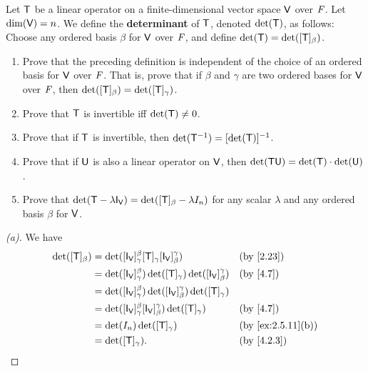 \begin{ex}\label{ex:5.1.7}
  Let \(\mathsf{T}\) be a linear operator on a finite-dimensional vector space \(\mathsf{V}\) over \(\mathit{F}\).
  Let \(\dim(\mathsf{V}) = n\).
  We define the \textbf{determinant} of \(\mathsf{T}\), denoted \(\det(\mathsf{T})\), as follows:
  Choose any ordered basis \(\beta\) for \(\mathsf{V}\) over \(\mathit{F}\), and define \(\det(\mathsf{T}) = \det([\mathsf{T}]_{\beta})\).
  \begin{enumerate}
    \item Prove that the preceding definition is independent of the choice of an ordered basis for \(\mathsf{V}\) over \(\mathit{F}\).
          That is, prove that if \(\beta\) and \(\gamma\) are two ordered bases for \(\mathsf{V}\) over \(\mathit{F}\), then \(\det([\mathsf{T}]_{\beta}) = \det([\mathsf{T}]_{\gamma})\).
    \item Prove that \(\mathsf{T}\) is invertible iff \(\det(\mathsf{T}) \neq 0\).
    \item Prove that if \(\mathsf{T}\) is invertible, then \(\det(\mathsf{T}^{-1}) = [\det(\mathsf{T})]^{-1}\).
    \item Prove that if \(\mathsf{U}\) is also a linear operator on \(\mathsf{V}\), then \(\det(\mathsf{T} \mathsf{U}) = \det(\mathsf{T}) \cdot \det(\mathsf{U})\).
    \item Prove that \(\det(\T - \lambda \IT[\V]) = \det([\T]_{\beta} - \lambda I_n)\) for any scalar \(\lambda\) and any ordered basis \(\beta\) for \(\mathsf{V}\).
  \end{enumerate}
\end{ex}

\begin{proof}[(a)]
  We have
  \begin{align*}
    \det([\T]_{\beta}) & = \det([\IT[\V]]_{\gamma}^{\beta} [\T]_{\gamma} [\IT[\V]]_{\beta}^{\gamma})             &  & \text{(by \cref{2.23})}         \\
                       & = \det([\IT[\V]]_{\gamma}^{\beta}) \det([\T]_{\gamma}) \det([\IT[\V]]_{\beta}^{\gamma}) &  & \text{(by \cref{4.7})}          \\
                       & = \det([\IT[\V]]_{\gamma}^{\beta}) \det([\IT[\V]]_{\beta}^{\gamma}) \det([\T]_{\gamma})                                      \\
                       & = \det([\IT[\V]]_{\gamma}^{\beta} [\IT[\V]]_{\beta}^{\gamma}) \det([\T]_{\gamma})       &  & \text{(by \cref{4.7})}          \\
                       & = \det(I_n) \det([\T]_{\gamma})                                                         &  & \text{(by \cref{ex:2.5.11}(b))} \\
                       & = \det([\T]_{\gamma}).                                                                  &  & \text{(by \cref{4.2.3})}
  \end{align*}
\end{proof}

